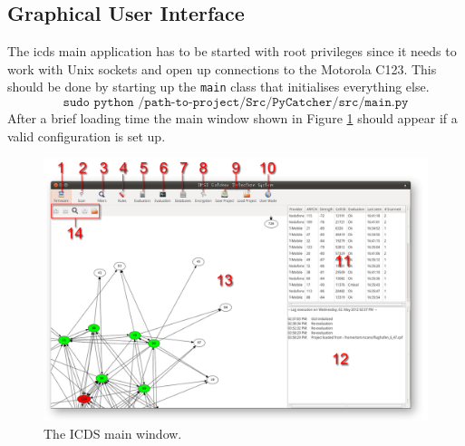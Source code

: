 \subsection{Graphical User Interface}
\label{sec:icds_operation}
The \gls{icds} main application has to be started with root privileges since it needs to work with Unix sockets and open up connections to the Motorola C123.
This should be done by starting up the \texttt{main} class that initialises everything else.
\[\texttt{sudo python /path-to-project/Src/PyCatcher/src/main.py}\]
After a brief loading time the main window shown in Figure \ref{fig:icds} should appear if a valid configuration is set up.

\begin{figure}
\centering
\includegraphics[width=\textwidth]{../Images/ICDS}
\caption{The ICDS main window.}
\label{fig:icds}
\end{figure}

